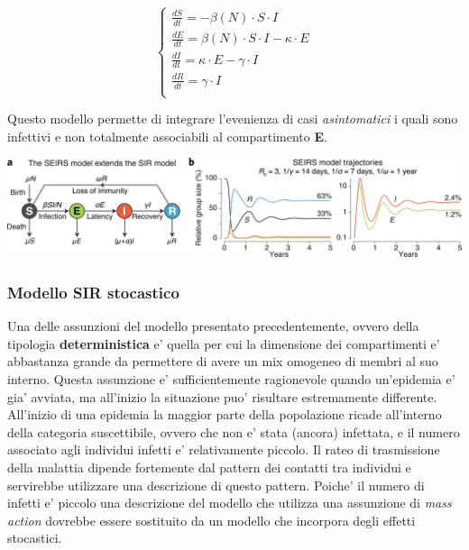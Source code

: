 \[
    \left\{
    \begin{array}{ll}
        \frac{dS}{dt} = - \beta(N) \cdot S \cdot I\\
        \frac{dE}{dt} = \beta(N) \cdot S \cdot I - \kappa \cdot E\\
        \frac{dI}{dt} = \kappa \cdot E - \gamma \cdot I\\
        \frac{dR}{dt} = \gamma \cdot I\\
    \end{array}
    \right.
\]

Questo modello permette di integrare l'evenienza di casi \emph{asintomatici} i quali sono infettivi e non totalmente 
associabili al compartimento \textbf{E}.

\begin{minipage}{\linewidth}
    \centering
    \includegraphics[width=\textwidth]{img/41592_2020_856_Fig1_HTML.png}
    \label{fig:SEIRS_model}
\end{minipage}

\subsubsection{Modello SIR stocastico}
Una delle assunzioni del modello presentato precedentemente, ovvero della tipologia \textbf{deterministica} e' quella per cui la dimensione 
dei compartimenti e' abbastanza grande da permettere di avere un mix omogeneo di membri al suo interno. Questa assunzione e' sufficientemente
ragionevole quando un'epidemia e' gia' avviata, ma all'inizio la situazione puo' risultare estremamente differente. All'inizio di una 
epidemia la maggior parte della popolazione ricade all'interno della categoria suscettibile, ovvero che non e' stata (ancora) infettata, e il numero associato 
agli individui infetti e' relativamente piccolo. Il rateo di trasmissione della malattia dipende fortemente dal pattern dei contatti tra individui e servirebbe utilizzare 
una descrizione di questo pattern. Poiche' il numero di infetti e' piccolo una descrizione del modello che utilizza una assunzione di \emph{mass action} dovrebbe essere 
sostituito da un modello che incorpora degli effetti stocastici.


